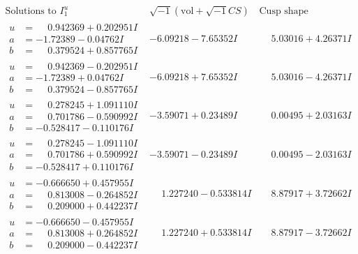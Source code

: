 \documentclass[1p]{elsarticle_modified}
\theoremstyle{definition}
\newcommand{\I}{\sqrt{-1}}
\begin{document}
$$\begin{array}{c|c|c}  
\text{Solutions to }I^u_{1}& \I (\text{vol} + \sqrt{-1}CS) & \text{Cusp shape}\\
 \hline 
\begin{aligned}
u &= \phantom{-}0.942369 + 0.202951 I \\
a &= -1.72389 - 0.04762 I \\
b &= \phantom{-}0.379524 + 0.857765 I\end{aligned}
 & -6.09218 - 7.65352 I & \phantom{-}5.03016 + 4.26371 I \\ \hline\begin{aligned}
u &= \phantom{-}0.942369 - 0.202951 I \\
a &= -1.72389 + 0.04762 I \\
b &= \phantom{-}0.379524 - 0.857765 I\end{aligned}
 & -6.09218 + 7.65352 I & \phantom{-}5.03016 - 4.26371 I \\ \hline\begin{aligned}
u &= \phantom{-}0.278245 + 1.091110 I \\
a &= \phantom{-}0.701786 - 0.590992 I \\
b &= -0.528417 - 0.110176 I\end{aligned}
 & -3.59071 + 0.23489 I & \phantom{-}0.00495 + 2.03163 I \\ \hline\begin{aligned}
u &= \phantom{-}0.278245 - 1.091110 I \\
a &= \phantom{-}0.701786 + 0.590992 I \\
b &= -0.528417 + 0.110176 I\end{aligned}
 & -3.59071 - 0.23489 I & \phantom{-}0.00495 - 2.03163 I \\ \hline\begin{aligned}
u &= -0.666650 + 0.457955 I \\
a &= \phantom{-}0.813008 - 0.264852 I \\
b &= \phantom{-}0.209000 + 0.442237 I\end{aligned}
 & \phantom{-}1.227240 - 0.533814 I & \phantom{-}8.87917 + 3.72662 I \\ \hline\begin{aligned}
u &= -0.666650 - 0.457955 I \\
a &= \phantom{-}0.813008 + 0.264852 I \\
b &= \phantom{-}0.209000 - 0.442237 I\end{aligned}
 & \phantom{-}1.227240 + 0.533814 I & \phantom{-}8.87917 - 3.72662 I \\ \hline\begin{aligned}

\end{aligned}
\end{array}$$
\end{document}
